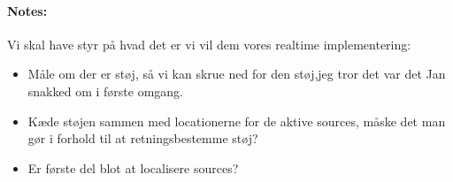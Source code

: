 \paragraph{Notes:}
Vi skal have styr på hvad det er vi vil dem vores realtime implementering:
\begin{itemize}
\item Måle om der er støj, så vi kan skrue ned for den støj,jeg tror det var det Jan snakked om i første omgang.
\item Kæde støjen sammen med locationerne for de aktive sources, måske det man gør i forhold til at retningsbestemme støj?
\item Er første del blot at localisere sources?
\end{itemize}
 